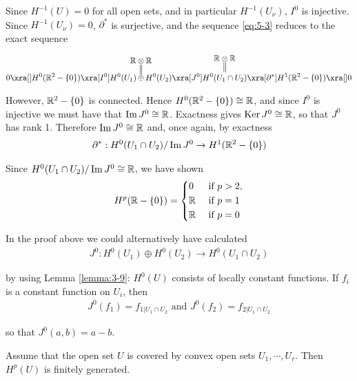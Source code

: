 Since $H^{-1}(U) = 0$ for all open sets, and in particular $H^{-1}(U_\nu)$, $I^0$ is
injective. Since $H^{-1}(U_\nu) = 0$, $\partial^*$ is surjective, and the sequence \eqref{eq:5-3} reduces to
the exact sequence

\begin{align*}
  0\xra[] H^0(\RR^2-\{0\})\xra[I^0] H^0(U_1)
  \hspace*{-1em}\overset{\substack{\displaystyle\RR\otimes\RR\\\big|\!\big|}}{\oplus}\hspace*{-1em} 
  H^0(U_2)\xra[J^0] 
  \overset{\substack{\displaystyle\RR\otimes\RR\\\big|\!\big|}}{H^0(U_1\cap U_2)}
  \xra[\partial^*]H^1(\RR^2-\{0\})\xra[] 0
\end{align*}

However, $\mathbb{R}^2-\{0\}$ is connected. Hence $H^0(\mathbb{R}^2-\{0\}) \cong \mathbb{R}$, and since $I^0$ is 
injective we must have that $\operatorname{Im} J^0\cong\mathbb{R}$. Exactness gives $\operatorname{Ker} J^0\cong\mathbb{R}$, so that $J^0$
has rank 1. Therefore $\operatorname{Im} J^0\cong \mathbb{R}$ and, once again, by exactness
\begin{align*}
  \partial^*: H^0(U_1\cap U_2)/\operatorname{Im} J^0 \to H^1(\mathbb{R}^2-\{0\})
\end{align*}

Since $H^0(U_1\cap U_2)/\operatorname{Im} J^0\cong \mathbb{R}$, we have shown
\begin{align*}
  H^p(\mathbb{R} - \{0\}) = \left\{\begin{aligned}
    & 0 && \text{ if } p>2,\\
    & \mathbb{R} && \text{ if } p = 1 \\
    & \mathbb{R} && \text{ if } p = 0
  \end{aligned}\right.
\end{align*}

In the proof above we could alternatively have calculated
\begin{align*}
  J^0:H^0(U_1)\oplus H^0(U_2)\to H^0(U_1\cap U_2)
\end{align*}

by using Lemma \ref{lemma:3-9}: $H^0(U)$ consists of locally constant functions. If $f_i$ is a
constant function on $U_i$, then
\begin{align*}
  J^0(f_1) = f_{1|U_1\cap U_2} \text{ and } J^0(f_2) = f_{2|U_1\cap U_2}
\end{align*}

so that $J^0(a, b) = a - b$.

\begin{theorem}\label{theorem:5-5}
  Assume that the open set $U$ is covered by convex open sets $U_1, \cdots, U_r$. Then $H^p(U)$ is finitely generated.
\end{theorem}

